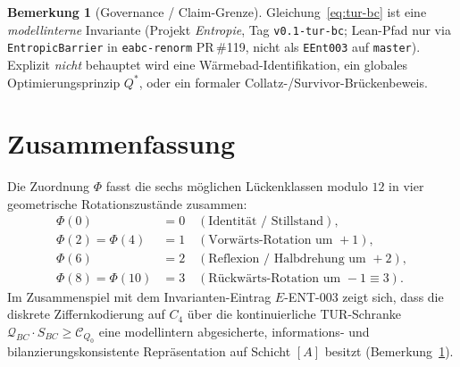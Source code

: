 \documentclass[11pt]{article}
\theoremstyle{definition}
\newtheorem{remark}{Bemerkung}
\begin{document}
\begin{remark}[Governance / Claim-Grenze]
\label{rem:claim-e-ent-003}
Gleichung~\eqref{eq:tur-bc} ist eine \emph{modellinterne} Invariante
(Projekt \emph{Entropie}, Tag \texttt{v0.1-tur-bc}; Lean-Pfad nur via
\texttt{EntropicBarrier} in \texttt{eabc-renorm} PR\,\#119, nicht als
\texttt{EEnt003} auf \texttt{master}).
Explizit \emph{nicht} behauptet wird eine W\"arme\-bad-Identifikation, ein globales
Optimierungsprinzip $Q^*$, oder ein formaler Collatz-/Survivor-Br\"uckenbeweis.
\end{remark}

\section{Zusammenfassung}

Die Zuordnung $\Phi$ fasst die sechs m\"oglichen L\"uckenklassen modulo $12$ in vier
geometrische Rotationszust\"ande zusammen:
\begin{align*}
\Phi(0) &= 0 \quad (\text{Identit\"at / Stillstand}),\\
\Phi(2)=\Phi(4) &= 1 \quad (\text{Vorw\"arts-Rotation um }+1),\\
\Phi(6) &= 2 \quad (\text{Reflexion / Halbdrehung um }+2),\\
\Phi(8)=\Phi(10) &= 3 \quad (\text{R\"uckw\"arts-Rotation um }-1\equiv 3).
\end{align*}
Im Zusammenspiel mit dem Invarianten-Eintrag $E$-ENT-$003$ zeigt sich, dass die
diskrete Ziffernkodierung auf $C_4$ \"uber die kontinuierliche TUR-Schranke
$\mathcal{Q}_{BC}\cdot S_{BC}\ge\mathcal{C}_{Q_0}$ eine modellintern abgesicherte,
informations- und bilanzierungskonsistente Repr\"asentation auf Schicht $[A]$ besitzt
(Bemerkung~\ref{rem:claim-e-ent-003}).
\end{document}
